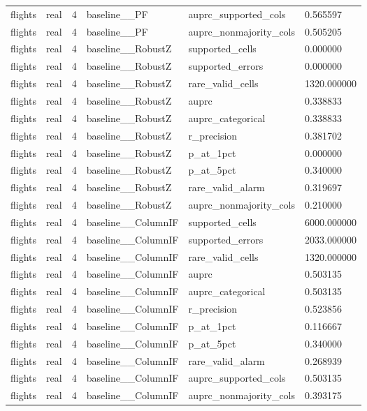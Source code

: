 \begin{tabular}{llllll}
flights & real & 4 & baseline\_\_PF & auprc\_supported\_cols & 0.565597 \\
flights & real & 4 & baseline\_\_PF & auprc\_nonmajority\_cols & 0.505205 \\
flights & real & 4 & baseline\_\_RobustZ & supported\_cells & 0.000000 \\
flights & real & 4 & baseline\_\_RobustZ & supported\_errors & 0.000000 \\
flights & real & 4 & baseline\_\_RobustZ & rare\_valid\_cells & 1320.000000 \\
flights & real & 4 & baseline\_\_RobustZ & auprc & 0.338833 \\
flights & real & 4 & baseline\_\_RobustZ & auprc\_categorical & 0.338833 \\
flights & real & 4 & baseline\_\_RobustZ & r\_precision & 0.381702 \\
flights & real & 4 & baseline\_\_RobustZ & p\_at\_1pct & 0.000000 \\
flights & real & 4 & baseline\_\_RobustZ & p\_at\_5pct & 0.340000 \\
flights & real & 4 & baseline\_\_RobustZ & rare\_valid\_alarm & 0.319697 \\
flights & real & 4 & baseline\_\_RobustZ & auprc\_nonmajority\_cols & 0.210000 \\
flights & real & 4 & baseline\_\_ColumnIF & supported\_cells & 6000.000000 \\
flights & real & 4 & baseline\_\_ColumnIF & supported\_errors & 2033.000000 \\
flights & real & 4 & baseline\_\_ColumnIF & rare\_valid\_cells & 1320.000000 \\
flights & real & 4 & baseline\_\_ColumnIF & auprc & 0.503135 \\
flights & real & 4 & baseline\_\_ColumnIF & auprc\_categorical & 0.503135 \\
flights & real & 4 & baseline\_\_ColumnIF & r\_precision & 0.523856 \\
flights & real & 4 & baseline\_\_ColumnIF & p\_at\_1pct & 0.116667 \\
flights & real & 4 & baseline\_\_ColumnIF & p\_at\_5pct & 0.340000 \\
flights & real & 4 & baseline\_\_ColumnIF & rare\_valid\_alarm & 0.268939 \\
flights & real & 4 & baseline\_\_ColumnIF & auprc\_supported\_cols & 0.503135 \\
flights & real & 4 & baseline\_\_ColumnIF & auprc\_nonmajority\_cols & 0.393175 \\

\end{tabular}
